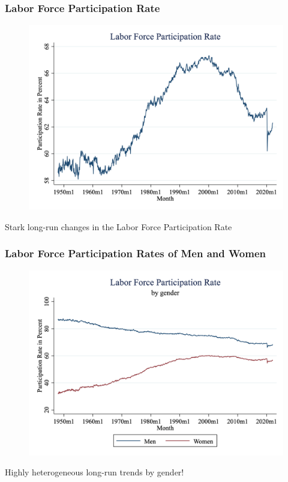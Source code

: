 \documentclass{beamer}
\begin{document}
\begin{frame}
\frametitle[alignment=center]{Labor Force Participation Rate}
\begin{figure}
\centering
\includegraphics[scale=0.25]{Figures/Fig_6pt3.png}
\end{figure}
Stark long-run changes in the Labor Force Participation Rate
\end{frame}

\begin{frame}
\frametitle[alignment=center]{Labor Force Participation Rates of Men and Women}
\begin{figure}
\centering
\includegraphics[scale=0.25]{Figures/Fig_6pt4.png}
\end{figure}
Highly heterogeneous long-run trends by gender!
\end{frame}
\end{document}
